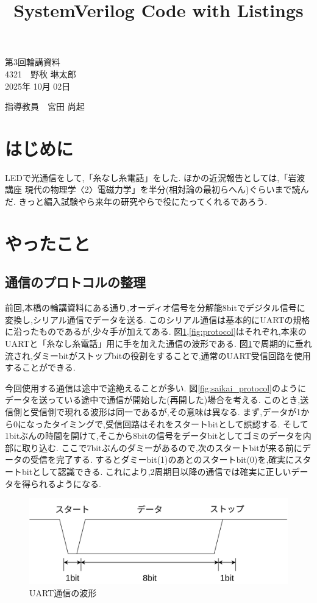 \documentclass[a4paper,10pt]{article}
\title{SystemVerilog Code with Listings}
\begin{document}
\begin{center}
\noindent
{\LARGE 第3回輪講資料} \\
{\large 4321　野秋 琳太郎} \\
2025年 10月 02日
\end{center}

\begin{flushright}
指導教員　宮田 尚起
\end{flushright}

\begin{multicols}{2}[\raggedcolumns]
\section{はじめに}
LEDで光通信をして,「糸なし糸電話」をした.
ほかの近況報告としては,「岩波講座 現代の物理学〈2〉電磁力学」を半分(相対論の最初らへん)ぐらいまで読んだ.
きっと編入試験やら来年の研究やらで役にたってくれるであろう.

\section{やったこと}
\subsection{通信のプロトコルの整理}
前回,本橋の輪講資料にある通り,オーディオ信号を分解能8bitでデジタル信号に変換し,シリアル通信でデータを送る.
このシリアル通信は基本的にUARTの規格に沿ったものであるが,少々手が加えてある.
図\ref{fig:uart_protocol},\ref{fig:protocol}はそれぞれ,本来のUARTと「糸なし糸電話」用に手を加えた通信の波形である.
図\ref{fig:uart_protocol}で周期的に垂れ流され,ダミーbitがストップbitの役割をすることで,通常のUART受信回路を使用することができる.

今回使用する通信は途中で途絶えることが多い.
図\ref{fig:saikai_protocol}のようにデータを送っている途中で通信が開始した(再開した)場合を考える.
このとき,送信側と受信側で現れる波形は同一であるが,その意味は異なる.
まず,データが1から0になったタイミングで,受信回路はそれをスタートbitとして誤認する.
そして1bitぶんの時間を開けて,そこから8bitの信号をデータbitとしてゴミのデータを内部に取り込む.
ここで7bitぶんのダミーがあるので,次のスタートbitが来る前にデータの受信を完了する.
するとダミーbit(1)のあとのスタートbit(0)を,確実にスタートbitとして認識できる.
これにより,2周期目以降の通信では確実に正しいデータを得られるようになる.

\begin{figure}[H]
    \centering
    \includegraphics[width=0.9\linewidth]{figure/uart_protocol.png} 
    \caption{UART通信の波形} 
    \label{fig:uart_protocol}
\end{figure}
  

\end{multicols}
\end{document}
